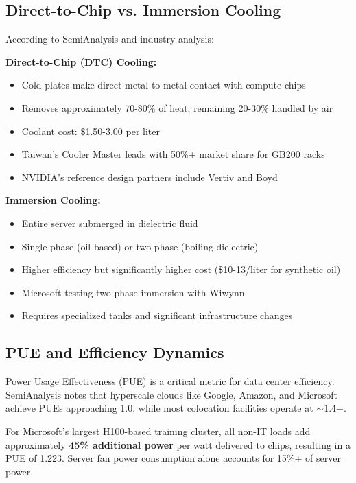 \documentclass[11pt,a4paper]{article}
\begin{document}
\subsection{Direct-to-Chip vs. Immersion Cooling}

According to SemiAnalysis and industry analysis:

\textbf{Direct-to-Chip (DTC) Cooling:}
\begin{itemize}[leftmargin=*, itemsep=3pt]
    \item Cold plates make direct metal-to-metal contact with compute chips
    \item Removes approximately 70-80\% of heat; remaining 20-30\% handled by air
    \item Coolant cost: \$1.50-3.00 per liter
    \item Taiwan's Cooler Master leads with 50\%+ market share for GB200 racks
    \item NVIDIA's reference design partners include Vertiv and Boyd
\end{itemize}

\textbf{Immersion Cooling:}
\begin{itemize}[leftmargin=*, itemsep=3pt]
    \item Entire server submerged in dielectric fluid
    \item Single-phase (oil-based) or two-phase (boiling dielectric)
    \item Higher efficiency but significantly higher cost (\$10-13/liter for synthetic oil)
    \item Microsoft testing two-phase immersion with Wiwynn
    \item Requires specialized tanks and significant infrastructure changes
\end{itemize}

\subsection{PUE and Efficiency Dynamics}

Power Usage Effectiveness (PUE) is a critical metric for data center efficiency. SemiAnalysis notes that hyperscale clouds like Google, Amazon, and Microsoft achieve PUEs approaching 1.0, while most colocation facilities operate at $\sim$1.4+.

For Microsoft's largest H100-based training cluster, all non-IT loads add approximately \textbf{45\% additional power} per watt delivered to chips, resulting in a PUE of 1.223. Server fan power consumption alone accounts for 15\%+ of server power.
\end{document}
